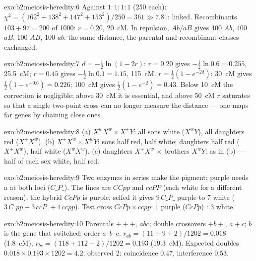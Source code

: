 \begin{solution}{exo:b2:meiosis-heredity:6}
Against $1 : 1 : 1 : 1$ (250 each): $\chi^2 = (162^2 + 138^2 + 147^2
+ 153^2)/250 = 361 \gg 7.81$: linked. Recombinants $103 + 97 = 200$
of 1000: $r = 0.20$, \qty{20}{cM}. In repulsion, $Ab/aB$ gives 400
$Ab$, 400 $aB$, 100 $AB$, 100 $ab$: the same distance, the parental
and recombinant classes exchanged.
\end{solution}

\begin{solution}{exo:b2:meiosis-heredity:7}
$d = -\tfrac12\ln(1 - 2r)$: $r = 0.20$ gives $-\tfrac12\ln 0.6 =
0.255$, \qty{25.5}{cM}; $r = 0.45$ gives $-\tfrac12\ln 0.1 = 1.15$,
\qty{115}{cM}. $r = \tfrac12(1 - e^{-2d})$: \qty{30}{cM} gives
$\tfrac12(1 - e^{-0.6}) = 0.226$; \qty{100}{cM} gives $\tfrac12(1 -
e^{-2}) = 0.43$. Below \qty{10}{cM} the correction is negligible;
above \qty{30}{cM} it is essential, and above \qty{50}{cM} $r$
saturates so that a single two-point cross can no longer measure the
distance --- one maps far genes by chaining close ones.
\end{solution}

\begin{solution}{exo:b2:meiosis-heredity:8}
(a) $X^wX^w \times X^+Y$: all sons white ($X^wY$), all daughters red
($X^+X^w$). (b) $X^+X^w \times X^wY$: sons half red, half white;
daughters half red ($X^+X^w$), half white ($X^wX^w$). (c) daughters
$X^+X^w$ $\times$ brothers $X^wY$: as in (b) --- half of each sex
white, half red.
\end{solution}

\begin{solution}{exo:b2:meiosis-heredity:9}
Two enzymes in series make the pigment; purple needs a 
 at both loci ($C\_P\_$). The lines are $CCpp$ and $ccPP$
(each white for a different reason); the hybrid $CcPp$ is purple;
selfed it gives $9\,C\_P\_$ purple to $7$ white ($3\,C\_pp + 3\,ccP\_ +
1\,ccpp$). Test cross $CcPp\times ccpp$: $1$ purple ($CcPp$) : $3$
white.
\end{solution}

\begin{solution}{exo:b2:meiosis-heredity:10}
Parentals $+++$, $abc$; double crossovers $+b+$, $a+c$; $b$ is the
gene that switched: order $a$--$b$--$c$. $r_{ab} = (11 + 9 + 2)/1202
= 0.018$ (\qty{1.8}{cM}); $r_{bc} = (118 + 112 + 2)/1202 = 0.193$
(\qty{19.3}{cM}). Expected doubles $0.018\times 0.193\times 1202 =
4.2$; observed 2: coincidence $0.47$, interference $0.53$.
\end{solution}

